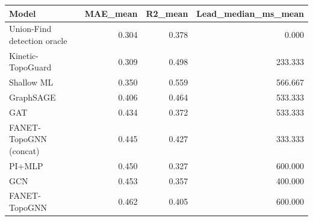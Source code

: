 \begin{tabular}{lrrr}
\toprule
Model & MAE\_mean & R2\_mean & Lead\_median\_ms\_mean \\
\midrule
Union-Find detection oracle & 0.304 & 0.378 & 0.000 \\
Kinetic-TopoGuard & 0.309 & 0.498 & 233.333 \\
Shallow ML & 0.350 & 0.559 & 566.667 \\
GraphSAGE & 0.406 & 0.464 & 533.333 \\
GAT & 0.434 & 0.372 & 533.333 \\
FANET-TopoGNN (concat) & 0.445 & 0.427 & 333.333 \\
PI+MLP & 0.450 & 0.327 & 600.000 \\
GCN & 0.453 & 0.357 & 400.000 \\
FANET-TopoGNN & 0.462 & 0.405 & 600.000 \\
\bottomrule
\end{tabular}